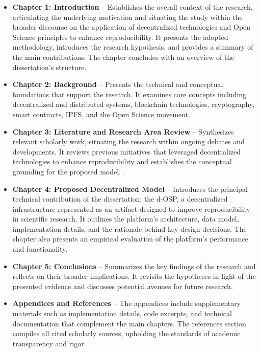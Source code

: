 \documentclass[final]{rc-book-2.14}
\begin{document}
\begin{itemize}
    \item \textbf{Chapter 1: Introduction} – Establishes the overall context of the research, articulating the underlying motivation and situating the study within the broader discourse on the application of decentralized technologies and Open Science principles to enhance reproducibility. It presents the adopted methodology, introduces the research hypothesis, and provides a summary of the main contributions. The chapter concludes with an overview of the dissertation's structure.

    \item \textbf{Chapter 2: Background} – Presents the technical and conceptual foundations that support the research. It examines core concepts including decentralized and distributed systems, blockchain technologies, cryptography, smart contracts, IPFS, and the Open Science movement.

    \item \textbf{Chapter 3: Literature and Research Area Review} – Synthesizes relevant scholarly work, situating the research within ongoing debates and developments. It reviews previous initiatives that leveraged decentralized technologies to enhance reproducibility and establishes the conceptual grounding for the proposed model.
.
    \item \textbf{Chapter 4: Proposed Decentralized Model} – Introduces the principal technical contribution of the dissertation: the d-OSP, a decentralized infrastructure represented as an artifact designed to improve reproducibility in scientific research. It outlines the platform’s architecture, data model, implementation details, and the rationale behind key design decisions. The chapter also presents an empirical evaluation of the platform’s performance and functionality.

    \item \textbf{Chapter 5: Conclusions} – Summarizes the key findings of the research and reflects on their broader implications. It revisits the hypotheses in light of the presented evidence and discusses potential avenues for future research.

    \item \textbf{Appendices and References} – The appendices include supplementary materials such as implementation details, code excerpts, and technical documentation that complement the main chapters. The references section compiles all cited scholarly sources, upholding the standards of academic transparency and rigor.

\end{itemize}
\end{document}
